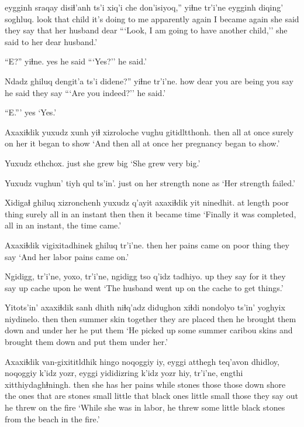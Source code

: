 \documentclass[12pt]{article}
\begin{document}
 eygginh sraqay disiɬ'anh ts'i xiq'i che don'isiyoq,'' yiɬne  tr'i'ne eygginh diqing' soghluq.
look that  child  {it's doing to me} {} apparently again {I became again} {she said} {they say} that {her husband} dear
\glt ```Look, I am going to have another child,'' she said to her dear husband.'
\glend

\gll ``E?'' yiɬne.
yes {he said}
\glt ```Yes?'' he said.'
\glend

\gll Ndadz ghiluq dengit'a ts'i didene?'' yiɬne  tr'i'ne. 
how  dear  {you are} being {you say} {he said}  {they say}
\glt ```Are you indeed?'' he said.'
\glend

\gll ``E.'''
yes
\glt `Yes.'
\glend

\gll Axaxiɬdik yuxudz {xunh yiɬ} {xizroloche} vughu  gitidltthonh.
then {} {all at once} surely   {on her}  {it began to show}
\glt `And then all at once her pregnancy began to show.'
\glend

\gll Yuxudz ethchox.
just {she grew big}
\glt `She grew very big.'
\glend

\gll Yuxudz vughun' tiyh  qul ts'in'.
just  {on her}  strength none as
\glt `Her strength failed.'
\glend

\gll Xidigaɬ ghiluq  xizronchenh yuxudz {q'ayit} axaxiɬdik yit ninedhit.
{at length}  {poor thing} surely all  {in an instant} then then {it became time}
\glt `Finally it was completed, all in an instant, the time came.'
\glend

\gll Axaxiɬdik  vigixitadhinek ghiluq tr'i'ne.
then  {her pains came on} {poor thing} {they say}
\glt `And her labor pains came on.'
\glend

\gll Ngidigg, tr'i'ne, yoxo, tr'i'ne, ngidigg tso q'idz tadhiyo.
up  {they say} {for it} {they say} up cache upon {he went}
\glt `The husband went up on the cache to get things.'
\glend

\gll Yitots'in' axaxiɬdik sanh dhith niɬq'adz didughon xiɬdi nondolyo   ts'in' yoghyix niydinelo.
then  then  summer skin together {they are placed} then {he brought them down} and {under her} {he put them}
\glt `He picked up some summer caribou skins and brought them down and put them under her.'
\glend

\gll Axaxiɬdik van-gixititldhik hingo noqoggiy iy, eyggi  atthegh teq'avon dhidloy, noqoggiy k'idz yozr, eyggi yididizring k'idz yozr hiy, tr'i'ne, engthi  xitthiydaghɬningh.
then {she has her pains} while stones those those  down  shore {the ones that are} stones small little that {black ones} little small those {they say} out {he threw on the fire}
\glt `While she was in labor, he threw some little black stones from the beach in the fire.'
\glend
\end{document}

